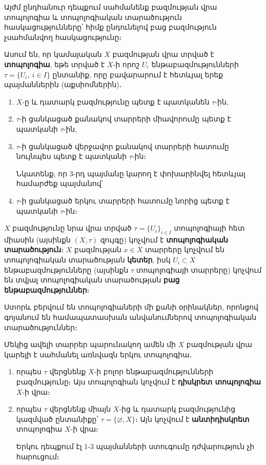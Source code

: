 \documentclass[./main.tex]{subfiles}
\begin{document}
\par Այժմ ընդհանուր դեպքում սահմանենք բազմության վրա տոպոլոգիա և տոպո\-լո\-գիա\-կան տարածություն հասկացությունները՝ հիմք ընդունելով բաց բազմություն չսահման\-վող հասկացությունը։

\begin{definition}
Ասում են, որ կամայական $X$ բազմության վրա տրված է \textbf{տոպոլոգիա}, եթե տրված է $X$-ի որոշ $U_i$ ենթաբազմությունների $\tau=\{U_i,\ i\in I\}$ ընտանիք, որը բավարարում է հետևյալ երեք պայմաններին (աքսիոմներին)․
\begin{enumerate}
    \item $X$-ը և դատարկ բազմությունը պետք է պատկանեն $\tau$-ին,
	\item $\tau$-ի ցանկացած քանակով տարրերի միավորումը պետք է պատկանի $\tau$-ին,
	\item $\tau$-ի ցանկացած վերջավոր քանակով տարրերի հատումը նույնպես պետք է պատկանի $\tau$-ին։
	\par Նկատենք, որ 3-րդ պայմանը կարող է փոխարինվել հետևյալ համարժեք պայ\-մա\-նով՝
	\item[3$'$.] $\tau$-ի ցանկացած երկու տարրերի հատումը նորից պետք է պատկանի $\tau$-ին։
\end{enumerate}
\end{definition}


\begin{definition}
$X$ բազմությունը նրա վրա տրված $\tau=\{U_i\}_{i\in I}$ տոպոլոգիայի հետ միասին (այսինքն $(X, \tau)$ զույգը) կոչվում է \textbf{տոպոլոգիական տարածություն}։ $X$ բազմության $x\in X$ տարրերը կոչվում են տոպոլոգիական տարածության \textbf{կետեր}, իսկ $U_i \subset X$  ենթաբազմությունները (այսինքն $\tau$ տոպոլոգիայի տարրերը) կոչվում են տվյալ տոպոլոգիական տարածության \textbf{բաց ենթաբազմություններ}։
\end{definition}


Ստորև բերվում են տոպոլոգիաների մի քանի օրինակներ, որոնցով գոյանում են համապատասխան անվանումներով տոպոլոգիական տարածություններ։

\begin{example}
Մեկից ավելի տարրեր պարունակող ամեն մի $X$ բազմության վրա կարելի է սահմանել առնվազն երկու տոպոլոգիա․
\begin{enumerate}
    \item[ա)] որպես $\tau$ վերցնենք $X$-ի բոլոր ենթաբազմությունների բազմությունը։
	Այս տո\-պո\-լոգիան կոչվում է \textbf{դիսկրետ տոպոլոգիա} $X$-ի վրա։
	\item[բ)] որպես $\tau$ վերցնենք միայն $X$-ից և դատարկ բազմությունից կազմված ընտա\-նիքը՝ $\tau=\{\varnothing, X\}$։ Այն կոչվում է \textbf{անտիդիսկրետ} տոպոլոգիա $X$-ի վրա։
    \par	Երկու դեպքում էլ 1-3 պայմանների ստուգումը դժվարություն չի հարուցում։
\end{enumerate}
\end{example}
\end{document}

